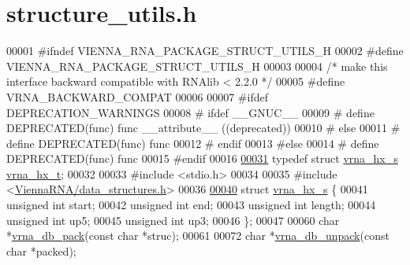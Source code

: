 \hypertarget{structure__utils_8h_source}{}\section{structure\+\_\+utils.\+h}
\label{structure__utils_8h_source}

\begin{DoxyCode}
00001 \textcolor{preprocessor}{#ifndef VIENNA\_RNA\_PACKAGE\_STRUCT\_UTILS\_H}
00002 \textcolor{preprocessor}{#define VIENNA\_RNA\_PACKAGE\_STRUCT\_UTILS\_H}
00003 
00004 \textcolor{comment}{/* make this interface backward compatible with RNAlib < 2.2.0 */}
00005 \textcolor{preprocessor}{#define VRNA\_BACKWARD\_COMPAT}
00006 
00007 \textcolor{preprocessor}{#ifdef DEPRECATION\_WARNINGS}
00008 \textcolor{preprocessor}{# ifdef \_\_GNUC\_\_}
00009 \textcolor{preprocessor}{#  define DEPRECATED(func) func \_\_attribute\_\_ ((deprecated))}
00010 \textcolor{preprocessor}{# else}
00011 \textcolor{preprocessor}{#  define DEPRECATED(func) func}
00012 \textcolor{preprocessor}{# endif}
00013 \textcolor{preprocessor}{#else}
00014 \textcolor{preprocessor}{# define DEPRECATED(func) func}
00015 \textcolor{preprocessor}{#endif}
00016 
\hypertarget{structure__utils_8h_source.tex_l00031}{}\hyperlink{group__struct__utils_ga877363f3a1703b53ecd025c6fcf897a0}{00031} \textcolor{keyword}{typedef} \textcolor{keyword}{struct }\hyperlink{structvrna__hx__s}{vrna\_hx\_s}  \hyperlink{structvrna__hx__s}{vrna\_hx\_t};
00032 
00033 \textcolor{preprocessor}{#include <stdio.h>}
00034 
00035 \textcolor{preprocessor}{#include <\hyperlink{data__structures_8h}{ViennaRNA/data\_structures.h}>}
00036 
\hypertarget{structure__utils_8h_source.tex_l00040}{}\hyperlink{structvrna__hx__s}{00040} \textcolor{keyword}{struct }\hyperlink{structvrna__hx__s}{vrna\_hx\_s} \{
00041   \textcolor{keywordtype}{unsigned} \textcolor{keywordtype}{int} start;
00042   \textcolor{keywordtype}{unsigned} \textcolor{keywordtype}{int} end;
00043   \textcolor{keywordtype}{unsigned} \textcolor{keywordtype}{int} length;
00044   \textcolor{keywordtype}{unsigned} \textcolor{keywordtype}{int} up5;
00045   \textcolor{keywordtype}{unsigned} \textcolor{keywordtype}{int} up3;
00046 \};
00047 
00060 \textcolor{keywordtype}{char} *\hyperlink{group__struct__utils_ga55c4783060a1464f862f858d5599c9e1}{vrna\_db\_pack}(\textcolor{keyword}{const} \textcolor{keywordtype}{char} *struc);
00061 
00072 \textcolor{keywordtype}{char} *\hyperlink{group__struct__utils_ga6490adff857d84ce06e6f379ae3a4512}{vrna\_db\_unpack}(\textcolor{keyword}{const} \textcolor{keywordtype}{char} *packed);

\end{DoxyCode}
